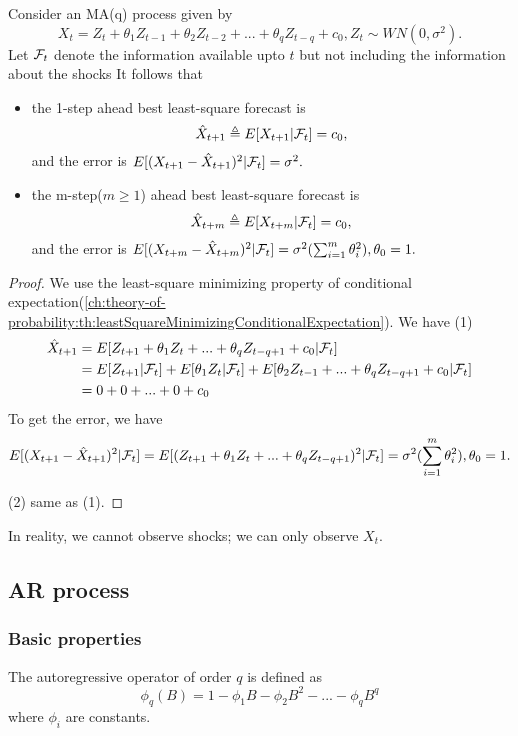 \begin{lemma}\cite[62]{tsay2005analysis}
	Consider an MA(q) process given by $$X_t = Z_t + \theta_1 Z_{t-1} + \theta_2 Z_{t-2} + ... + \theta_q Z_{t-q} + c_0, Z_t\sim WN(0,\sigma^2).$$ 
	Let $\mathcal{F}_t$ denote the information available upto $t$ but not including the information about the shocks It follows that
	\begin{itemize}
		\item the 1-step ahead best least-square forecast is
$$\hat{X}_{t+1} \triangleq E[X_{t+1}|\mathcal{F}_t] = c_0,$$
and the error is $E[(X_{t+1} - \hat{X}_{t+1})^2|\mathcal{F}_t] = \sigma^2.$	
\item the m-step($m \geq 1$) ahead best least-square forecast is
$$\hat{X}_{t+m}\triangleq E[X_{t+m}|\mathcal{F}_t] = c_0,$$
and the error is  $E[(X_{t+m} - \hat{X}_{t+m})^2|\mathcal{F}_t] = \sigma^2(\sum_{i=1}^{m} \theta_i^2),\theta_0 = 1.$
	\end{itemize}
\end{lemma}
\begin{proof}
	We use the least-square minimizing property of conditional expectation(\autoref{ch:theory-of-probability:th:leastSquareMinimizingConditionalExpectation}). We have	
	(1) 
	\begin{align*}
	\hat{X}_{t+1} &= E[Z_{t+1} + \theta_1 Z_{t} + ... + \theta_q Z_{t-q+1} + c_0|\mathcal{F}_t] \\
	&= E[Z_{t+1}|\mathcal{F}_t] + E[\theta_1 Z_{t}|\mathcal{F}_t] + E[\theta_2 Z_{t-1} + ... +\theta_q Z_{t-q+1} + c_0|\mathcal{F}_t] \\
	&=0 + 0 + ... + 0 + c_0 
	\end{align*}
	To get the error, we have
	$$E[(X_{t+1} - \hat{X}_{t+1})^2|\mathcal{F}_t] = E[(Z_{t+1} + \theta_1 Z_{t} + ... + \theta_q Z_{t-q+1})^2|\mathcal{F}_t] = \sigma^2(\sum_{i=1}^{m} \theta_i^2),\theta_0 = 1.$$

	(2) same as (1).
\end{proof}

\begin{remark}
In reality, we cannot observe shocks; we can only observe $X_t$.	
\end{remark}

\subsection{AR process}
\subsubsection{Basic properties}
\begin{definition}
\cite[11]{box2015time}The autoregressive operator of order $q$ is defined as
$$\phi_q(B) = 1 - \phi_1 B - \phi_2 B^2 - ... - \phi_q B^q$$
where $\phi_i$ are constants.
\end{definition}

